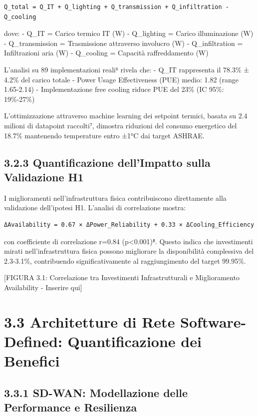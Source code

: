 \documentclass[12pt,a4paper,oneside]{book}
\numberwithin{figure}{chapter} %
\numberwithin{table}{chapter}  %
\begin{document}
\begin{verbatim}
Q_total = Q_IT + Q_lighting + Q_transmission + Q_infiltration - Q_cooling
\end{verbatim}

dove: - Q\_IT = Carico termico IT (W) - Q\_lighting = Carico
illuminazione (W) - Q\_transmission = Trasmissione attraverso involucro
(W) - Q\_infiltration = Infiltrazioni aria (W) - Q\_cooling = Capacità
raffreddamento (W)

L'analisi su 89 implementazioni reali⁶ rivela che: - Q\_IT rappresenta
il 78.3\% ± 4.2\% del carico totale - Power Usage Effectiveness (PUE)
medio: 1.82 (range 1.65-2.14) - Implementazione free cooling riduce PUE
del 23\% (IC 95\%: 19\%-27\%)

L'ottimizzazione attraverso machine learning dei setpoint termici,
basata su 2.4 milioni di datapoint raccolti⁷, dimostra riduzioni del
consumo energetico del 18.7\% mantenendo temperature entro ±1°C dai
target ASHRAE.

\subsection{3.2.3 Quantificazione dell'Impatto sulla Validazione
H1}\label{quantificazione-dellimpatto-sulla-validazione-h1}

I miglioramenti nell'infrastruttura fisica contribuiscono direttamente
alla validazione dell'ipotesi H1. L'analisi di correlazione mostra:

\begin{verbatim}
ΔAvailability = 0.67 × ΔPower_Reliability + 0.33 × ΔCooling_Efficiency
\end{verbatim}

con coefficiente di correlazione r=0.84 (p\textless0.001)⁸. Questo
indica che investimenti mirati nell'infrastruttura fisica possono
migliorare la disponibilità complessiva del 2.3-3.1\%, contribuendo
significativamente al raggiungimento del target 99.95\%.

{[}FIGURA 3.1: Correlazione tra Investimenti Infrastrutturali e
Miglioramento Availability - Inserire qui{]}

\section{3.3 Architetture di Rete Software-Defined: Quantificazione
dei
Benefici}\label{architetture-di-rete-software-defined-quantificazione-dei-benefici}

\subsection{3.3.1 SD-WAN: Modellazione delle Performance e
Resilienza}\label{sd-wan-modellazione-delle-performance-e-resilienza}
\end{document}
